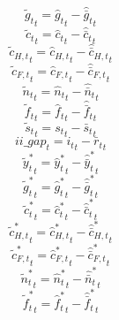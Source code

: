 \begin{dmath}
{{\tilde g_t}}_{t}={{\hat g_t}}_{t}-{{\hat {\bar g}_t}}_{t}
\end{dmath}
\begin{dmath}
{{\tilde c_t}}_{t}={{\hat c_t}}_{t}-{{\hat {\bar c}_t}}_{t}
\end{dmath}
\begin{dmath}
{{\tilde c_{H,t}}}_{t}={{\hat c_{H,t}}}_{t}-{{\hat {\bar c}_{H,t}}}_{t}
\end{dmath}
\begin{dmath}
{{\tilde c_{F,t}}}_{t}={{\hat c_{F,t}}}_{t}-{{\hat {\bar c}_{F,t}}}_{t}
\end{dmath}
\begin{dmath}
{{\tilde n_t}}_{t}={{\hat n_t}}_{t}-{{\hat {\bar n}_t}}_{t}
\end{dmath}
\begin{dmath}
{{\tilde f_t}}_{t}={{\hat f_t}}_{t}-{{\hat {\bar f}_t}}_{t}
\end{dmath}
\begin{dmath}
{{\tilde s_t}}_{t}={{s_t}}_{t}-{{\bar s_t}}_{t}
\end{dmath}
\begin{dmath}
{ii\_gap}_{t}={{i_t}}_{t}-{{\bar r_t}}_{t}
\end{dmath}
\begin{dmath}
{{\tilde y_t^*}}_{t}={{\hat y_t^*}}_{t}-{{\hat {\bar y}_t^*}}_{t}
\end{dmath}
\begin{dmath}
{{\tilde g_t^*}}_{t}={{\hat g_t^*}}_{t}-{{\hat {\bar g}_t^*}}_{t}
\end{dmath}
\begin{dmath}
{{\tilde c_t^*}}_{t}={{\hat c_t^*}}_{t}-{{\hat {\bar c}_t^*}}_{t}
\end{dmath}
\begin{dmath}
{{\tilde c_{H,t}^*}}_{t}={{\hat c_{H,t}^*}}_{t}-{{\hat {\bar c}_{H,t}^*}}_{t}
\end{dmath}
\begin{dmath}
{{\tilde c_{F,t}^*}}_{t}={{\hat c_{F,t}^*}}_{t}-{{\hat {\bar c}_{F,t}^*}}_{t}
\end{dmath}
\begin{dmath}
{{\tilde n_t^*}}_{t}={{\hat n_t^*}}_{t}-{{\hat {\bar n}_t^*}}_{t}
\end{dmath}
\begin{dmath}
{{\tilde f_t^*}}_{t}={{\hat f_t^*}}_{t}-{{\hat {\bar f}_t^*}}_{t}
\end{dmath}
